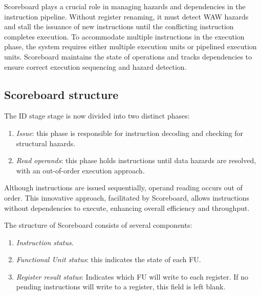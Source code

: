 Scoreboard plays a crucial role in managing hazards and dependencies in the instruction pipeline. 
Without register renaming, it must detect WAW hazards and stall the issuance of new instructions until the conflicting instruction completes execution.
To accommodate multiple instructions in the execution phase, the system requires either multiple execution units or pipelined execution units. 
Scoreboard maintains the state of operations and tracks dependencies to ensure correct execution sequencing and hazard detection.

\subsection{Scoreboard structure}
The ID stage stage is now divided into two distinct phases:
\begin{enumerate}
    \item \textit{Issue}: this phase is responsible for instruction decoding and checking for structural hazards.
    \item \textit{Read operands}: this phase holds instructions until data hazards are resolved, with an out-of-order execution approach.
\end{enumerate}
Although instructions are issued sequentially, operand reading occurs out of order. 
This innovative approach, facilitated by Scoreboard, allows instructions without dependencies to execute, enhancing overall efficiency and throughput.

The structure of Scoreboard consists of several components:
\begin{enumerate}
    \item \textit{Instruction status}.
    \item \textit{Functional Unit status}: this indicates the state of each FU. 
    \item \textit{Register result status}: Indicates which FU will write to each register. 
        If no pending instructions will write to a register, this field is left blank.
\end{enumerate}

